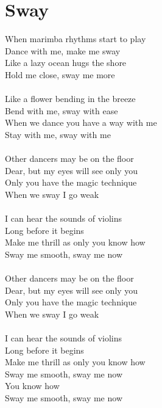 \section{Sway}
When marimba rhythms start to play\\
Dance with me, make me sway\\
Like a lazy ocean hugs the shore\\
Hold me close, sway me more\\
\\
Like a flower bending in the breeze\\
Bend with me, sway with ease\\
When we dance you have a way with me\\
Stay with me, sway with me\\
\\
Other dancers may be on the floor\\
Dear, but my eyes will see only you\\
Only you have the magic technique\\
When we sway I go weak\\
\\
I can hear the sounds of violins\\
Long before it begins\\
Make me thrill as only you know how\\
Sway me smooth, sway me now\\
\\
Other dancers may be on the floor\\
Dear, but my eyes will see only you\\
Only you have the magic technique\\
When we sway I go weak\\
\\
I can hear the sounds of violins\\
Long before it begins\\
Make me thrill as only you know how\\
Sway me smooth, sway me now\\
You know how\\
Sway me smooth, sway me now\\